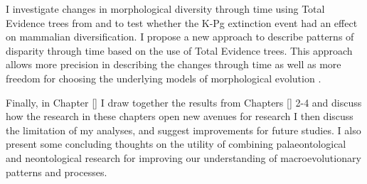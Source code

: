 I investigate changes in morphological diversity \citep[or disparity;][]{Wills1994} through time using Total Evidence trees from \cite{slaterphylogenetic2013} and \cite{beckancient2014} to test whether the K-Pg extinction event had an effect on mammalian diversification.
I propose a new approach to describe patterns of disparity through time based on the use of Total Evidence trees.
This approach allows more precision in describing the changes through time as well as more freedom for choosing the underlying models of morphological evolution \citep[e.g. punctuated or gradual;][]{Hunt21042015}.



Finally, in Chapter \ref{} I draw together the results from Chapters \ref{} 2-4 and discuss how the research in these chapters open new avenues for research %
I then discuss the limitation of my analyses, and suggest improvements for future studies.
I also present some concluding thoughts on the utility of combining palaeontological and neontological research for improving our understanding of macroevolutionary patterns and processes.

%